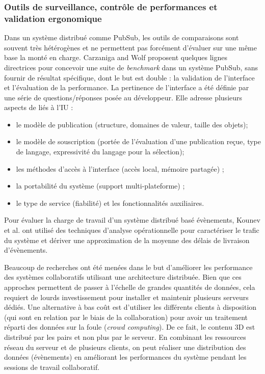 \subsubsection{Outils de surveillance, contrôle de performances et validation ergonomique}
Dans un système distribué comme \gls{PubSub}, les outils de comparaisons 
sont souvent très hétérogènes et ne permettent pas forcément d'évaluer sur une 
même base la monté en charge. 
Carzaniga and Wolf \cite{Carzaniga2002} proposent quelques 
lignes directrices pour concevoir une suite de \textit{benchmark} dans un système 
\gls{PubSub}, sans fournir de résultat spécifique, dont le but est double : la 
validation de l'interface et l'évaluation de la performance. 
La pertinence de l'interface a été définie par une série de questions/réponses 
posée au développeur. Elle adresse plusieurs aspects de liés à l'\gls{IU} : 
\begin{itemize}
	\item le modèle de publication (structure, domaines de valeur, taille des objets);
	\item le modèle de souscription (portée de l'évaluation d'une publication reçue, 
	type de langage, expressivité du langage pour la sélection);
	\item les méthodes d'accès à l'interface (accès local, mémoire partagée) ; 
	\item la portabilité du système (support multi-plateforme) ;
	\item le type de service (fiabilité) et les fonctionnalités auxiliaires. 
\end{itemize}

Pour évaluer la charge de travail d'un système distribué basé évènements, 
Kounev et al. \cite{Kounev2008} ont utilisé des techniques d'analyse 
opérationnelle pour caractériser le trafic du système et dériver une approximation 
de la moyenne des délais de livraison d'évènements. 

Beaucoup de recherches ont été menées dans le but d'améliorer les performance 
des systèmes collaboratifs utilisant une architecture distribuée. Bien que ces 
approches permettent de passer à l'échelle de grandes quantités de données, cela 
requiert de lourds investissement pour installer et maintenir plusieurs serveurs 
dédiés. Une alternative à bas coût est d'utiliser les différents clients à disposition 
(qui sont en relation par le biais de la collaboration) pour avoir un traitement réparti 
des données sur la foule (\textit{crowd computing})\cite{Li2015}. De ce fait, le 
contenu 3D est distribué par les pairs et non plus par le serveur. En combinant les 
ressources réseau du serveur et de plusieurs clients, on peut réaliser une 
distribution des données (évènements) en améliorant les performances du 
système pendant les sessions de travail collaboratif. 




